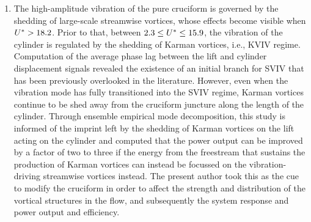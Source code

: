\documentclass[oneside]{utmthesis}
\begin{document}
\begin{enumerate}
  \item The high-amplitude vibration of the pure cruciform is governed by the shedding of large-scale streamwise vortices, whose effects become visible when $U^{*} > 18.2$. Prior to that, between $2.3 \leq U^{*} \leq 15.9$, the vibration of the cylinder is regulated by the shedding of Karman vortices, i.e., KVIV regime. Computation of the average phase lag between the lift and cylinder displacement signals revealed the existence of an initial branch for SVIV that has been previously overlooked in the literature. However, even when the vibration mode has fully transitioned into the SVIV regime, Karman vortices continue to be shed away from the cruciform juncture along the length of the cylinder. Through ensemble empirical mode decomposition, this study is informed of the imprint left by the shedding of Karman vortices on the lift acting on the cylinder and computed that the power output can be improved by a factor of two to three if the energy from the freestream that sustains the production of Karman vortices can instead be focussed on the vibration-driving streamwise vortices instead. The present author took this as the cue to modify the cruciform in order to affect the strength and distribution of the vortical structures in the flow, and subsequently the system response and power output and efficiency.


\end{enumerate}
\end{document}
